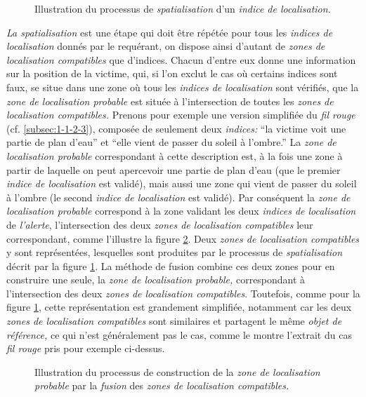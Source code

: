 \begin{figure}[hb]
  \centering
  
  \caption{Illustration du processus de \emph{spatialisation} d'un
    \emph{indice de localisation.}}
  \label{fig:obj_spa}
\end{figure}

\emph{La spatialisation} est une étape qui doit être répétée pour tous
les \emph{indices de localisation} donnés par le requérant, on dispose
ainsi d'autant de \emph{zones de localisation compatibles} que
d'indices. Chacun d'entre eux donne une information sur la position de
la victime, qui, si l'on exclut le cas où certains indices sont faux,
se situe dans une zone où tous les \emph{indices de localisation} sont
vérifiés, \ie que la \emph{zone de localisation probable} est située à
l'intersection de toutes les \emph{zones de localisation compatibles.}
%
Prenons pour exemple une version simplifiée du \emph{fil rouge}
(cf. \autoref{subsec:1-1-2-3}), composée de seulement deux
\emph{indices:} \enquote{la victime voit une partie de plan d'eau} et
\enquote{elle vient de passer du soleil à l'ombre.}  La \emph{zone de
  localisation probable} correspondant à cette description est, à la
fois une zone à partir de laquelle on peut apercevoir une partie de
plan d'eau (\ie que le premier \emph{indice de localisation} est
validé), mais aussi une zone qui vient de passer du soleil à l'ombre
(\ie le second \emph{indice de localisation} est validé). Par
conséquent la \emph{zone de localisation probable} correspond à la
zone validant les deux \emph{indices de localisation} de
\emph{l'alerte}, \ie l'intersection des deux \emph{zones de
  localisation compatibles} leur correspondant, comme l'illustre la
figure \ref{fig:obj_fus}. Deux \emph{zones de localisation
  compatibles} y sont représentées, lesquelles sont produites par le
processus de \emph{spatialisation} décrit par la figure
\ref{fig:obj_spa}. La méthode de fusion combine ces deux zones pour en
construire une seule, la \emph{zone de localisation probable,}
correspondant à l'intersection des deux \emph{zones de localisation
  compatibles}. Toutefois, comme pour la figure \ref{fig:obj_spa},
cette représentation est grandement simplifiée, notamment car les deux
\emph{zones de localisation compatibles} sont similaires et partagent
le même \emph{objet de référence,} ce qui n'est généralement pas le
cas, comme le montre l'extrait du cas \emph{fil rouge} pris pour
exemple ci-dessus.

\begin{figure}
  \centering
  
  \caption{Illustration du processus de construction de la \emph{zone
      de localisation probable} par la \emph{fusion} des \emph{zones
      de localisation compatibles.}}
  \label{fig:obj_fus}
\end{figure}

